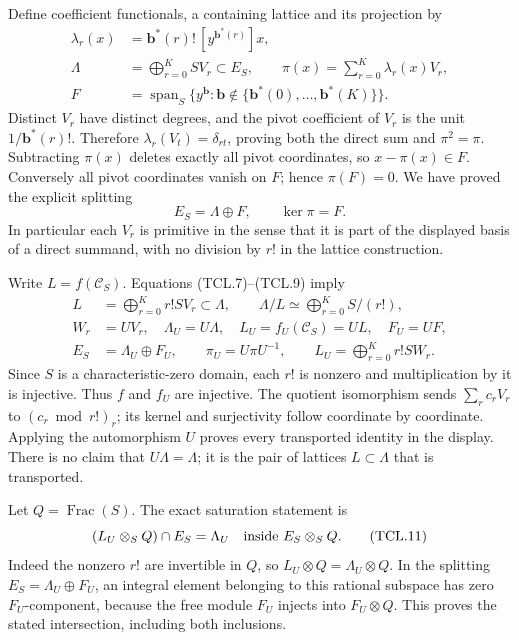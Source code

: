 Define coefficient functionals, a containing lattice and its projection by
\[
 \begin{split}
 \lambda_r(x)&=\mathbf b^*(r)!\,[y^{\mathbf b^*(r)}]x,\\
 \Lambda&=\bigoplus_{r=0}^K S V_r\subset E_S,\qquad
 \pi(x)=\sum_{r=0}^K\lambda_r(x)V_r,\\
 F&=\operatorname{span}_S
       \{y^{\mathbf b}:\mathbf b\notin\{\mathbf b^*(0),\ldots,
                                                   \mathbf b^*(K)\}\}.
 \end{split}
 \tag{TCL.8}\label{CFStage:eq:tcl-splitting}
\]
Distinct \(V_r\) have distinct degrees, and the pivot coefficient
of \(V_r\) is the unit \(1/\mathbf b^*(r)!\). Therefore
\(\lambda_r(V_t)=\delta_{rt}\), proving both the direct sum and
\(\pi^2=\pi\). Subtracting \(\pi(x)\) deletes exactly all pivot
coordinates, so \(x-\pi(x)\in F\). Conversely all pivot
coordinates vanish on \(F\); hence \(\pi(F)=0\). We have proved
the explicit splitting
\[
 E_S=\Lambda\oplus F,\qquad \ker\pi=F.
 \tag{TCL.9}\label{CFStage:eq:tcl-direct}
\]
In particular each \(V_r\) is primitive in the sense that it is
part of the displayed basis of a direct summand, with no division
by \(r!\) in the lattice construction.

Write \(L=f(\mathcal C_S)\). Equations (TCL.7)--(TCL.9) imply
\[
 \begin{split}
 L&=\bigoplus_{r=0}^K r!S V_r\subset\Lambda,\qquad
 \Lambda/L\simeq\bigoplus_{r=0}^K S/(r!),\\
 W_r&=U V_r,\quad \Lambda_U=U\Lambda,
 \quad L_U=f_U(\mathcal C_S)=UL,\quad F_U=UF,\\
 E_S&=\Lambda_U\oplus F_U,\qquad
 \pi_U=U\pi U^{-1},\qquad
 L_U=\bigoplus_{r=0}^K r!S W_r.
 \end{split}
 \tag{TCL.10}\label{CFStage:eq:tcl-unit-lattices}
\]
Since \(S\) is a characteristic-zero domain, each \(r!\) is
nonzero and multiplication by it is injective. Thus \(f\) and
\(f_U\) are injective. The quotient isomorphism sends
\(\sum_r c_r V_r\) to \((c_r\bmod r!)_r\); its kernel and
surjectivity follow coordinate by coordinate. Applying the
automorphism \(U\) proves every transported identity in the
display. There is no claim that \(U\Lambda=\Lambda\); it is the
pair of lattices \(L\subset\Lambda\) that is transported.

Let \(Q=\operatorname{Frac}(S)\). The exact saturation statement is
\[
 (L_U\otimes_S Q)\cap E_S=\Lambda_U
       \quad\hbox{inside }E_S\otimes_S Q.
 \tag{TCL.11}\label{CFStage:eq:tcl-saturation}
\]
Indeed the nonzero \(r!\) are invertible in \(Q\), so
\(L_U\otimes Q=\Lambda_U\otimes Q\). In the splitting
\(E_S=\Lambda_U\oplus F_U\), an integral element belonging
to this rational subspace has zero \(F_U\)-component, because
the free module \(F_U\) injects into \(F_U\otimes Q\).
This proves the stated intersection, including both inclusions.

